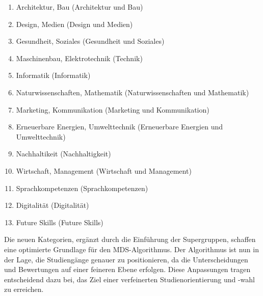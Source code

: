 \begin{enumerate}
    \item Architektur, Bau (Architektur und Bau)
    \item Design, Medien (Design und Medien)
    \item Gesundheit, Soziales (Gesundheit und Soziales)
    \item Maschinenbau, Elektrotechnik (Technik)
    \item Informatik (Informatik)
    \item Naturwissenschaften, Mathematik (Naturwissenschaften und Mathematik)
    \item Marketing, Kommunikation (Marketing und Kommunikation)
    \item Erneuerbare Energien, Umwelttechnik (Erneuerbare Energien und
    Umwelttechnik)
    \item Nachhaltikeit (Nachhaltigkeit)
    \item Wirtschaft, Management (Wirtschaft und Management)
    \item Sprachkompetenzen (Sprachkompetenzen)
    \item Digitalität (Digitalität)
    \item Future Skills (Future Skills)
\end{enumerate}

Die neuen Kategorien, ergänzt durch die Einführung der Supergruppen, schaffen eine optimierte Grundlage für den MDS-Algorithmus. Der Algorithmus ist nun in der Lage, die Studiengänge genauer zu positionieren, da die Unterscheidungen und Bewertungen auf einer feineren Ebene erfolgen. Diese Anpassungen tragen entscheidend dazu bei, das Ziel einer verfeinerten Studienorientierung und -wahl zu erreichen.
